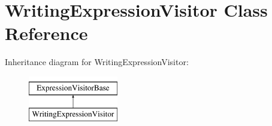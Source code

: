 \hypertarget{class_writing_expression_visitor}{\section{Writing\+Expression\+Visitor Class Reference}
\label{class_writing_expression_visitor}
}
Inheritance diagram for Writing\+Expression\+Visitor\+:\begin{figure}[H]
\begin{center}
\leavevmode
\includegraphics[height=2.000000cm]{class_writing_expression_visitor}
\end{center}
\end{figure}
